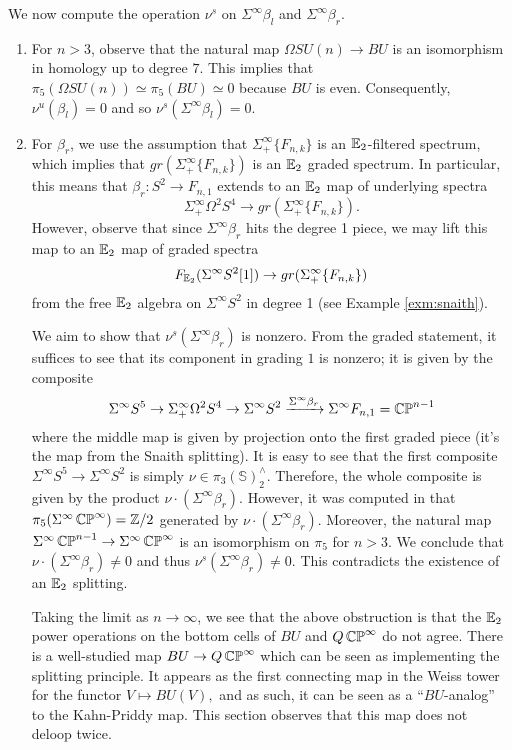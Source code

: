 We now compute the operation $\nu^s$ on $\Sigma^{\infty} \beta_l$ and $\Sigma^{\infty} \beta_r$.  
\begin{enumerate}
\item For $n>3$, observe that the natural map $\Omega SU(n) \to BU$ is an isomorphism in homology up to degree $7$.  This implies that $\pi_5(\Omega SU(n)) \simeq \pi_5(BU) \simeq 0$ because $BU$ is even.  Consequently, $\nu^u(\beta_l) = 0$ and so $\nu^s(\Sigma^{\infty} \beta_l) = 0.$  

\item For $\beta_r$, we use the assumption that $\Sigma^{\infty}_+ \{ F_{n,k} \}$ is an $\operatorname{\mathbb{E}}_2$-filtered spectrum, which implies that $gr(\Sigma^{\infty}_+ \{ F_{n,k} \})$ is an $\operatorname{\mathbb{E}}_2$ graded spectrum.  In particular, this means that $\beta_r: S^2 \to F_{n,1}$ extends to an $\operatorname{\mathbb{E}}_2$ map of underlying spectra $$\Sigma^{\infty}_+ \Omega^2 S^4 \to  gr(\Sigma^{\infty}_+ \{ F_{n,k} \}).$$  However, observe that since $\Sigma^{\infty} \beta_r$ hits the degree 1 piece, we may lift this map to an $\operatorname{\mathbb{E}}_2$ map of graded spectra $$F_{\operatorname{\mathbb{E}}_2}(\Sigma^\infty S^2[1]) \to gr(\Sigma^{\infty}_+ \{ F_{n,k} \})$$ from the free $\operatorname{\mathbb{E}}_2$ algebra on $\Sigma^{\infty} S^2$ in degree 1 (see Example \ref{exm:snaith}).  

We aim to show that $\nu^s(\Sigma^\infty \beta_r)$ is nonzero.  From the graded statement, it suffices to see that its component in grading $1$ is nonzero; it is given by the composite $$\Sigma^{\infty} S^5 \to \Sigma^{\infty}_+ \Omega^2 S^4 \to \Sigma^{\infty} S^2 \xrightarrow{\Sigma^{\infty} \beta_r} \Sigma^{\infty} F_{n,1} = \operatorname{\mathbb{CP}}^{n-1}$$ where the middle map is given by projection onto the first graded piece (it's the map from the Snaith splitting).  It is easy to see that the first composite $\Sigma^{\infty} S^5 \to \Sigma^{\infty} S^2$ is simply $\nu \in \pi_3(\mathbb{S})^{\wedge}_2.$  Therefore, the whole composite is given by the product $\nu\cdot (\Sigma^{\infty} \beta_r).$  
However, it was computed in \cite[Theorem II.8]{Liulevicius} that $\pi_5(\Sigma^{\infty}\operatorname{\mathbb{CP}}^{\infty})=\mathbb{Z}/2$ generated by $\nu \cdot (\Sigma^{\infty}\beta_r).$  Moreover, the natural map $\Sigma^{\infty}\operatorname{\mathbb{CP}}^{n-1} \to \Sigma^{\infty}\operatorname{\mathbb{CP}}^\infty$ is an isomorphism on $\pi_5$ for $n>3$.  We conclude that $\nu \cdot (\Sigma^{\infty}\beta_r )\neq 0$ and thus $\nu^s(\Sigma^{\infty} \beta_r) \neq 0$.  This contradicts the existence of an $\operatorname{\mathbb{E}}_2$ splitting.   





\begin{rmk}
Taking the limit as $n\to\infty$, we see that the above obstruction is that the $\operatorname{\mathbb{E}}_2$ power operations on the bottom cells of $BU$ and $Q\operatorname{\mathbb{CP}}^{\infty}$ do not agree.  There is a well-studied map $BU \to Q\operatorname{\mathbb{CP}}^{\infty}$ which can be seen as implementing the splitting principle.  It appears as the first connecting map in the Weiss tower for the functor $V \mapsto BU(V),$ and as such, it can be seen as a ``$BU$-analog'' to the Kahn-Priddy map.  This section observes that this map does not deloop twice.
\end{rmk}


\end{enumerate}


